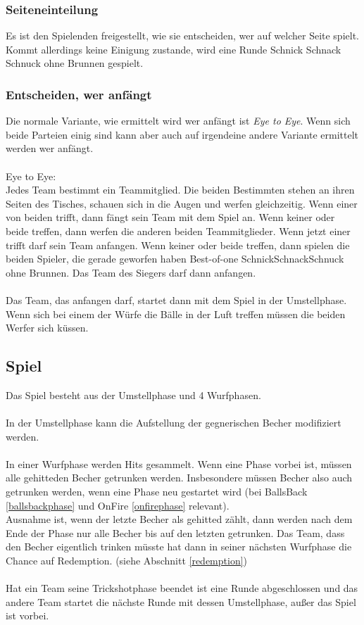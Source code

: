 \documentclass[a5paper, 12pt]{book}
\begin{document}
\subsubsection{Seiteneinteilung}\label{seiteneinteilung}
Es ist den Spielenden freigestellt, wie sie entscheiden, wer auf welcher Seite spielt. Kommt allerdings keine Einigung zustande, wird eine Runde Schnick Schnack Schnuck ohne Brunnen gespielt.
\subsubsection{Entscheiden, wer anfängt}\label{entscheidenweranfängt}
Die normale Variante, wie ermittelt wird wer anfängt ist \textit{Eye to Eye}. Wenn sich beide Parteien einig sind kann aber auch auf irgendeine andere Variante ermittelt werden wer anfängt. \\\\
Eye to Eye:\\
Jedes Team bestimmt ein Teammitglied. Die beiden Bestimmten stehen an ihren Seiten des Tisches, schauen sich in die Augen und werfen gleichzeitig. Wenn einer von beiden trifft, dann fängt sein Team mit dem Spiel an. Wenn keiner oder beide treffen, dann werfen die anderen beiden Teammitglieder. Wenn jetzt einer trifft darf sein Team anfangen. Wenn keiner oder beide treffen, dann spielen die beiden Spieler, die gerade geworfen haben Best-of-one SchnickSchnackSchnuck ohne Brunnen. Das Team des Siegers darf dann anfangen. \\\\Das Team, das anfangen darf, startet dann mit dem Spiel in der Umstellphase.\\
Wenn sich bei einem der Würfe die Bälle in der Luft treffen müssen die beiden Werfer sich küssen.
\subsection{Spiel}\label{spiel}
Das Spiel besteht aus der Umstellphase und 4 Wurfphasen. \\\\
In der Umstellphase kann die Aufstellung der gegnerischen Becher modifiziert werden. \\\\
In einer Wurfphase werden Hits gesammelt. Wenn eine Phase vorbei ist, müssen alle gehitteden Becher getrunken werden. Insbesondere müssen Becher also auch getrunken werden, wenn eine Phase neu gestartet wird (bei BallsBack \ref{ballsbackphase} und OnFire \ref{onfirephase} relevant).\\
 Ausnahme ist, wenn der letzte Becher als gehitted zählt, dann werden nach dem Ende der Phase nur alle Becher bis auf den letzten getrunken. Das Team, dass den Becher eigentlich trinken müsste hat dann in seiner nächsten Wurfphase die Chance auf Redemption. (siehe Abschnitt \ref{redemption})\\\\
Hat ein Team seine Trickshotphase beendet ist eine Runde abgeschlossen und das andere Team startet die nächste Runde mit dessen Umstellphase, außer das Spiel ist vorbei.\\\\
\end{document}
